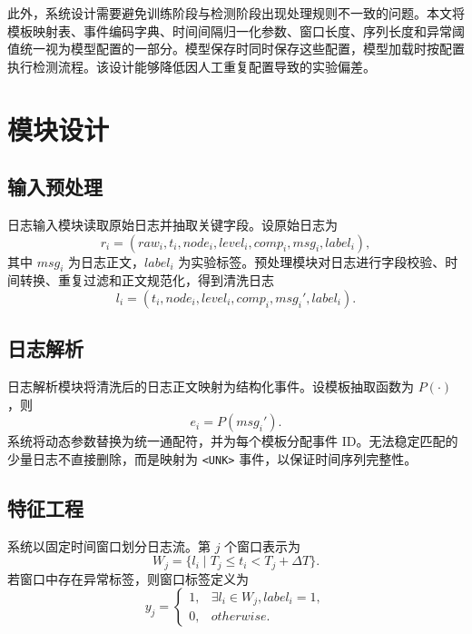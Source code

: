 此外，系统设计需要避免训练阶段与检测阶段出现处理规则不一致的问题。本文将模板映射表、事件编码字典、时间间隔归一化参数、窗口长度、序列长度和异常阈值统一视为模型配置的一部分。模型保存时同时保存这些配置，模型加载时按配置执行检测流程。该设计能够降低因人工重复配置导致的实验偏差。

\section{模块设计}

\subsection{输入预处理}

日志输入模块读取原始日志并抽取关键字段。设原始日志为
\begin{equation}
    r_i=(raw_i,t_i,node_i,level_i,comp_i,msg_i,label_i),
\end{equation}
其中 $msg_i$ 为日志正文，$label_i$ 为实验标签。预处理模块对日志进行字段校验、时间转换、重复过滤和正文规范化，得到清洗日志
\begin{equation}
    l_i=(t_i,node_i,level_i,comp_i,msg_i',label_i).
\end{equation}

\subsection{日志解析}

日志解析模块将清洗后的日志正文映射为结构化事件。设模板抽取函数为 $P(\cdot)$，则
\begin{equation}
    e_i=P(msg_i').
\end{equation}
系统将动态参数替换为统一通配符，并为每个模板分配事件 ID。无法稳定匹配的少量日志不直接删除，而是映射为 \texttt{<UNK>} 事件，以保证时间序列完整性。

\subsection{特征工程}

系统以固定时间窗口划分日志流。第 $j$ 个窗口表示为
\begin{equation}
    W_j=\{l_i\mid T_j \leq t_i < T_j+\Delta T\}.
\end{equation}
若窗口中存在异常标签，则窗口标签定义为
\begin{equation}
    y_j=
    \begin{cases}
        1, & \exists l_i\in W_j,label_i=1,\\
        0, & otherwise.
    \end{cases}
\end{equation}

